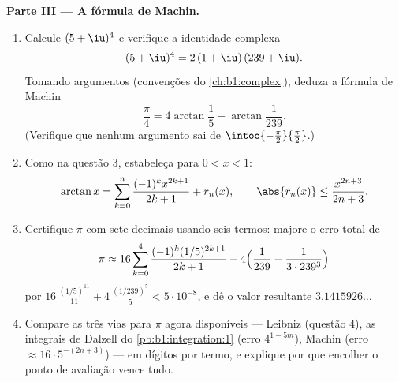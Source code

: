 \begin{problem}
\medskip
\noindent\textbf{Parte III --- A fórmula de Machin.}
\begin{enumerate}[resume]
  \item Calcule $(5 + \iu)^4$ e verifique a identidade complexa
        \[
        (5 + \iu)^4 = 2\,(1 + \iu)\,(239 + \iu) .
        \]
        Tomando argumentos (convenções do \cref{ch:b1:complex}),
        deduza a fórmula de Machin
        \[
        \frac\pi4 = 4\arctan\frac15 - \arctan\frac{1}{239} .
        \]
        (Verifique que nenhum argumento sai de
        $\intoo{-\frac\pi2}{\frac\pi2}$.)
  \item Como na questão 3, estabeleça para $0 < x < 1$:
        \[
        \arctan x = \sum_{k=0}^{n} \frac{(-1)^k
        x^{2k+1}}{2k+1} + r_n(x), \qquad \abs{r_n(x)} \leq
        \frac{x^{2n+3}}{2n+3} .
        \]
  \item Certifique $\pi$ com sete decimais usando seis termos: majore
        o erro total de
        \[
        \pi \approx 16\sum_{k=0}^{4}
        \frac{(-1)^k (1/5)^{2k+1}}{2k+1}
        - 4\Bigl(\frac{1}{239} - \frac{1}{3\cdot239^3}\Bigr)
        \]
        por $16\,\frac{(1/5)^{11}}{11} +
        4\,\frac{(1/239)^5}{5} < 5\cdot10^{-8}$, e dê o valor
        resultante $3.1415926\dots$
  \item Compare as três vias para $\pi$ agora disponíveis ---
        Leibniz (questão 4), as integrais de Dalzell do
        \cref{pb:b1:integration:1} (erro $4^{1-5m}$), Machin
        (erro $\approx 16\cdot 5^{-(2n+3)}$) --- em dígitos por
        termo, e explique por que encolher o ponto de avaliação
        vence tudo.
\end{enumerate}


\end{problem}
